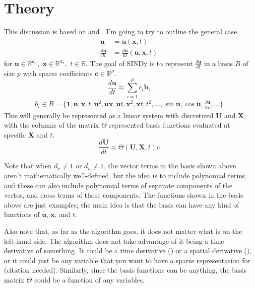 \documentclass{article}
\let\vec\mathbf
\def\real{\mathbb{R}}
\begin{document}
\section{Theory}

This discussion is based on \cite{brunton2016sindy} and \cite{shea2020sindy-bvp}.
I'm going to try to outline the general case. 
\begin{align}
\vec{u} &= \vec{u}(\vec{x}, t) \\
\frac{d\vec{u}}{dt} &= \frac{d\vec{u}}{dt}(\vec{u}, \vec{x}, t)
\end{align}
for $\vec{u} \in \real^{d_u}, \,\, \vec{x} \in \real^{d_x}, \,\, t \in \real$.
The goal of SINDy is to represent $\frac{d\vec{u}}{dt}$ in a basis $B$ of size
$p$ with sparse coefficients $\vec{c} \in \real^p$.
\begin{equation}
\frac{d\vec{u}}{dt} \approx \sum_{i=1}^p c_i \vec{b_i}
\end{equation}
\begin{align}
b_i \in B = \{\vec{1}, \vec{u}, \vec{x}, t, \vec{u}^2, \vec{u}\vec{x},\vec{u}t,\vec{x}^2,\vec{x}t,t^2,\hdots,\sin\vec{u},\cos{\vec{u}}, \frac{\partial\vec{u}}{\partial \vec{x}},\hdots\}
\end{align}
This will generally be represented as a linear system with discretized $\vec{U}$
and $\vec{X}$, with the columns of the matrix $\Theta$ represented basis
functions evaluated at specific $\vec{X}$ and $t$.
\begin{equation}\label{eq:basis-system}
\frac{d\vec{U}}{dt} \approx \Theta(\vec{U}, \vec{X}, t) c
\end{equation}

Note that when $d_x \ne 1$ or $d_u \ne 1$, the vector terms in the basis shown above
aren't mathematically well-defined, but the idea is to include polynomial terms,
and these can also include polynomial terms of separate components of the
vector, and cross terms of those components. The functions shown in the basis
above are just examples; the main idea is that the basis can have any kind of
functions of $\vec{u}$, $\vec{x}$, and $t$.

Also note that, as far as the algorithm goes, it does not matter what is on the
left-hand side. The algorithm does not take advantage of it being a time
derivative of something. It could be a time derivative (\cite{brunton2016sindy})
or a spatial derivative (\cite{shea2020sindy-bvp}), or it could just be any
variable that you want to have a sparse representation for (citation needed).
Similarly, since the basis functions can be anything, the basis matrix $\Theta$
could be a function of any variables.
\end{document}
